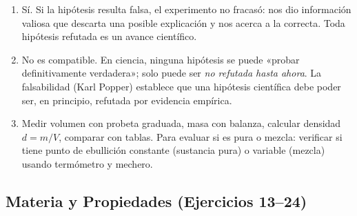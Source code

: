 \documentclass[12pt, a4paper]{article}
\begin{document}
\begin{enumerate}[leftmargin=*, label=\textbf{\arabic*.}]
  \item Sí. Si la hipótesis resulta falsa, el experimento no fracasó: nos dio información valiosa que descarta una posible explicación y nos acerca a la correcta. Toda hipótesis refutada es un avance científico.

  \item No es compatible. En ciencia, ninguna hipótesis se puede «probar definitivamente verdadera»; solo puede ser \emph{no refutada hasta ahora}. La falsabilidad (Karl Popper) establece que una hipótesis científica debe poder ser, en principio, refutada por evidencia empírica.

  \item Medir volumen con probeta graduada, masa con balanza, calcular densidad $d = m/V$, comparar con tablas. Para evaluar si es pura o mezcla: verificar si tiene punto de ebullición constante (sustancia pura) o variable (mezcla) usando termómetro y mechero.
\end{enumerate}

\subsection*{Materia y Propiedades (Ejercicios 13--24)}
\end{document}
